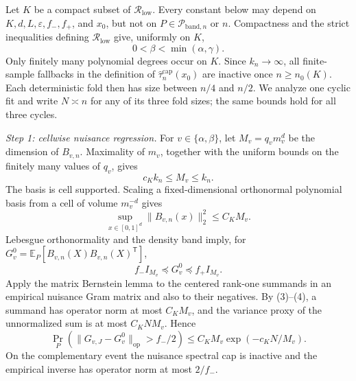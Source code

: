 Let \(K\) be a compact subset of \(\mathcal R_{\mathrm{low}}\).  Every constant below may depend on \(K,d,L,\varepsilon,f_{-},f_{+}\), and \(x_0\), but not on \(P\in\mathcal P_{\mathrm{band},n}\) or \(n\).  Compactness and the strict inequalities defining \(\mathcal R_{\mathrm{low}}\) give, uniformly on \(K\),
\[
0<\beta<\min(\alpha,\gamma).
\tag{1}
\]
Only finitely many polynomial degrees occur on \(K\).  Since \(k_n\to\infty\), all finite-sample fallbacks in the definition of \(\widehat\tau_n^{\mathrm{cap}}(x_0)\) are inactive once \(n\ge n_0(K)\).  Each deterministic fold then has size between \(n/4\) and \(n/2\).  We analyze one cyclic fit and write \(N\asymp n\) for any of its three fold sizes; the same bounds hold for all three cycles.

\emph{Step 1: cellwise nuisance regression.}
For \(v\in\{\alpha,\beta\}\), let \(M_v=q_vm_v^d\) be the dimension of \(B_{v,n}\).  Maximality of \(m_v\), together with the uniform bounds on the finitely many values of \(q_v\), gives
\[
c_Kk_n\le M_v\le k_n.
\tag{2}
\]
The basis is cell supported.  Scaling a fixed-dimensional orthonormal polynomial basis from a cell of volume \(m_v^{-d}\) gives
\[
\sup_{x\in[0,1]^d}\lVert B_{v,n}(x)\rVert_2^2\le C_KM_v.
\tag{3}
\]
Lebesgue orthonormality and the density band imply, for
\(G_v^0=\mathbb E_P[B_{v,n}(X)B_{v,n}(X)^{\mathsf T}]\),
\[
f_-I_{M_v}\preceq G_v^0\preceq f_+I_{M_v}.
\tag{4}
\]
Apply the matrix Bernstein lemma to the centered rank-one summands in an empirical nuisance Gram matrix and also to their negatives.  By (3)--(4), a summand has operator norm at most \(C_KM_v\), and the variance proxy of the unnormalized sum is at most \(C_KNM_v\).  Hence
\[
\Pr_P\!\left(\lVert G_{v,J}-G_v^0\rVert_{\mathrm{op}}>f_-/2\right)
\le C_KM_v\exp(-c_KN/M_v).
\tag{5}
\]
On the complementary event the nuisance spectral cap is inactive and the empirical inverse has operator norm at most \(2/f_-\).

